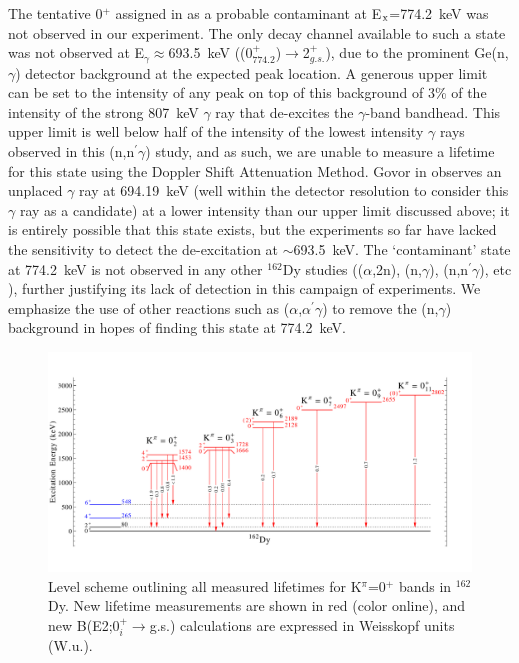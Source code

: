 The tentative 0$^+$ assigned in \cite{Meyer_pt0_2006} as a probable contaminant at E$_{\rm x}$=774.2~keV was not observed in our experiment. The only decay channel available to such a state was not observed at E$_\gamma\approx$693.5~keV ((0$^+_{774.2}$)$\rightarrow$2$^+_{g.s.}$), due to the prominent Ge(n,$\gamma$) detector background at the expected peak location. A generous upper limit can be set to the intensity of any peak on top of this background of 3\% of the intensity of the strong 807~keV $\gamma$ ray that de-excites the $\gamma$-band bandhead. This upper limit is well below half of the intensity of the lowest intensity $\gamma$ rays observed in this (n,n$^\prime\gamma$) study, and as such, we are unable to measure a lifetime for this state using the Doppler Shift Attenuation Method. Govor in \cite{Govor_162Dy2002} observes an unplaced $\gamma$ ray at 694.19~keV (well within the detector resolution to consider this $\gamma$ ray as a candidate) at a lower intensity than our upper limit discussed above; it is entirely possible that this state exists, but the experiments so far have lacked the sensitivity to detect the de-excitation at $\sim$693.5~keV. The `contaminant' state at 774.2~keV is not observed in any other $^{162}$Dy studies (($\alpha$,2n), (n,$\gamma$), (n,n$^\prime\gamma$), etc \cite{Aprahamian200642}), further justifying its lack of detection in this campaign of experiments. We emphasize the use of other reactions such as ($\alpha$,$\alpha^\prime\gamma$) to remove the (n,$\gamma$) background in hopes of finding this state at 774.2~keV.

\begin{landscape}
\begin{figure}[t]
\begin{center}
\includegraphics[height=0.85\textheight]{figures/162Dy_0s_all.pdf}
\caption{Level scheme outlining all measured lifetimes for K$^\pi$=0$^+$ bands in $^{162}$Dy. New lifetime measurements are shown in red (color online), and new B(E2;0$^+_i\rightarrow$g.s.) calculations are expressed in Weisskopf units (W.u.). \label{fig:162Dy_0s_all}}
\end{center}
\end{figure}
\end{landscape}


